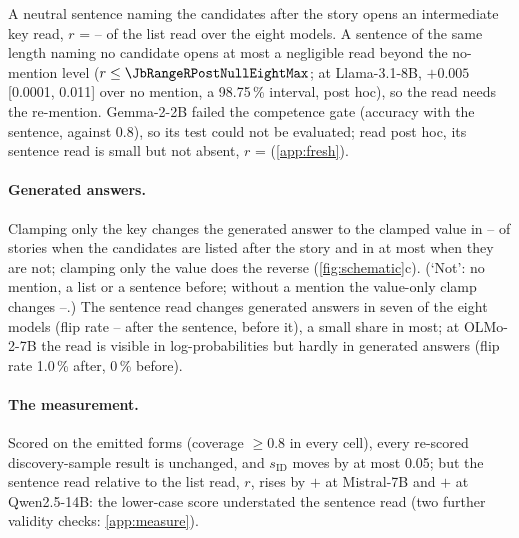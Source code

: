 A neutral sentence naming the candidates after the story opens an intermediate key read, $r$ = \JbRangeRPostEightMin--\JbRangeRPostEightMax{} of the list read over the eight models. A sentence of the same length naming no candidate opens at most a negligible read beyond the no-mention level ($r \leq \JbRangeRPostNullEightMax$; at Llama-3.1-8B, $+0.005$ [0.0001, 0.011] over no mention, a 98.75\,\% interval, post hoc), so the read needs the re-mention. Gemma-2-2B failed the competence gate (accuracy \JbGfiveAccPostGemmaTwo{} with the sentence, against 0.8), so its test could not be evaluated; read post hoc, its sentence read is small but not absent, $r$ = \ci{\JbRPostGemmaTwo}{\JbRPostGemmaTwoLo}{\JbRPostGemmaTwoHi} (\cref{app:fresh}). %

\paragraph{Generated answers.}
Clamping only the key changes the generated answer to the clamped value in \pctn{\JbRangeBetaKAfterEightMin}--\pct{\JbRangeBetaKAfterEightMax} of stories when the candidates are listed after the story and in at most \pct{\JbRangeBetaKNoneEightMax} when they are not; clamping only the value does the reverse (\cref{fig:schematic}c). (`Not': no mention, a list or a sentence before; without a mention the value-only clamp changes \pctn{\JbRangeBetaVNoneEightMin}--\pct{\JbRangeBetaVNoneEightMax}.) The sentence read changes generated answers in seven of the eight models (flip rate \pctn{\JbFivebFlipPostMetMin}--\pct{\JbFivebFlipPostMetMax} after the sentence, \pct{\JbRangeFlipPreEightMax} before it), a small share in most; at OLMo-2-7B the read is visible in log-probabilities but hardly in generated answers (flip rate 1.0\,\% after, 0\,\% before). %

\paragraph{The measurement.}
Scored on the emitted forms (coverage $\geq 0.8$ in every cell), every re-scored discovery-sample result is unchanged, and $s_{\mathrm{ID}}$ moves by at most 0.05; but the sentence read relative to the list read, $r$, rises by $+$\ci{\JbSixbRPostMistralSeven}{\JbSixbRPostMistralSevenLo}{\JbSixbRPostMistralSevenHi} at Mistral-7B and $+$\ci{\JbSixbRPostQwenFourteen}{\JbSixbRPostQwenFourteenLo}{\JbSixbRPostQwenFourteenHi} at Qwen2.5-14B: the lower-case score understated the sentence read (two further validity checks: \cref{app:measure}).


